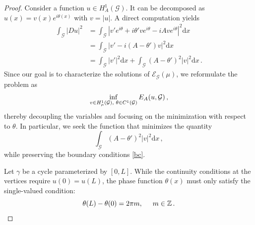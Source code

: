 \documentclass[12pt,a4paper]{amsart}
\theoremstyle{definition}
\theoremstyle{plain}
\numberwithin{equation}{section}
\begin{document}
\begin{proof}
Consider a function $u \in H^1_A(\mathcal{G})$. It can be decomposed as $u(x) = v(x)e^{i \theta(x)}$ with $v = |u|$.
A direct computation yields
\begin{align*}
    \int_{\mathcal{G}} |D u|^2 &= \int_\mathcal{G} \left| v'e^{i \theta} + i \theta' v e^{i\theta} - i A v e^{i\theta}\right|^2 \mathrm{d}x \\
    &= \int_\mathcal{G} \left| v' - i(A-\theta')v \right|^2 \mathrm{d}x \\
    &= \int_{\mathcal{G}} |v'|^2 \mathrm{d}x + \int_{\mathcal{G}} (A - \theta')^2 |v|^2 \mathrm{d}x\,.
\end{align*}
Since our goal is to characterize the solutions of $\mathcal{E}_{\mathcal{G}}(\mu)$, we reformulate the problem as
\begin{equation}
    \inf_{v \in H^1_{\mu}(\mathcal{G}), \hspace{1mm} \theta \in C^1(\mathcal{G}) } E_A(u, \mathcal{G}) \,,
\end{equation}
thereby decoupling the variables and focusing on the minimization with respect to $\theta$. In particular, we seek the function that minimizes the quantity
$$
\int_\mathcal{G} (A - \theta')^2 |v|^2 \mathrm{d}x\,,
$$
while preserving the boundary conditions \eqref{bc}. 
\bigskip

Let $\gamma$ be a cycle parameterized by $[0,L]$. While the continuity conditions at the vertices require $u(0) = u(L)$, the phase function $\theta(x)$ must only satisfy the single-valued condition:
\begin{equation}
\theta(L) - \theta(0) = 2\pi m, \hspace{0.5cm} m \in \mathbb{Z}\,.
\end{equation}


\end{proof}
\end{document}
